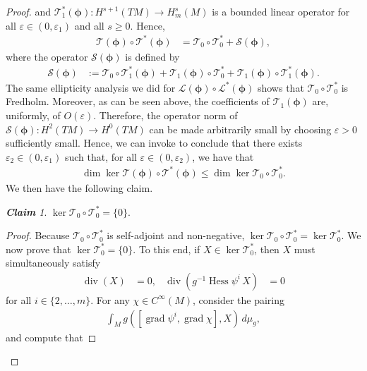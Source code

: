\documentclass{article}
\theoremstyle{remark}
\newtheorem*{claim*}{\bf Claim}
\newcommand{\M}{M}
\newcommand{\Cinf}{C^{\infty}(\M)}
\DeclareMathOperator{\grad}{\mathrm{grad}}
\DeclareMathOperator{\Div}{div}
\DeclareMathOperator{\Hess}{Hess}
\begin{document}
\begin{proof}
% 
and $\mathcal{T}_{1}^*(\bm{\phi}):H^{s+1}(T\M)\rightarrow H_m^{s}(\M)$ is a bounded linear operator for all $\varepsilon\in(0,\varepsilon_{1})$ and all $s\geq 0$. Hence,
%
\begin{align*}
    \mathcal{T}(\bm{\phi})\circ\mathcal{T}^*(\bm{\phi}) &= \mathcal{T}_0 \circ \mathcal{T}_0^* + \mathcal{S}(\bm{\phi}),
\end{align*}
%
where the operator $\mathcal{S}(\bm{\phi})$ is defined by
%
\begin{align*}
    \mathcal{S}(\bm{\phi})&:=\mathcal{T}_0\circ \mathcal{T}_{1}^*(\bm{\phi}) + \mathcal{T}_{1}(\bm{\phi}) \circ \mathcal{T}_{0}^* + \mathcal{T}_{1}(\bm{\phi})\circ \mathcal{T}_{1}^*(\bm{\phi}).
\end{align*}
%
The same ellipticity analysis we did for $\mathcal{L}(\bm{\phi})\circ\mathcal{L}^*(\bm{\phi})$ shows that $\mathcal{T}_0 \circ \mathcal{T}_0^*$ is Fredholm. Moreover, as can be seen above, the coefficients of $\mathcal{T}_{1}(\bm{\phi})$ are, uniformly, of $O(\varepsilon)$. Therefore, the operator norm of $\mathcal{S}(\bm{\phi}):H^2(T\M)\rightarrow H^0(T\M)$ can be made arbitrarily small by choosing $\varepsilon>0$ sufficiently small. Hence, we can invoke \cite[Theorem 5.22, Chapter IV]{kato1966perturbation} to conclude that there exists $\varepsilon_{2}\in(0,\varepsilon_1)$ such that, for all $\varepsilon\in(0,\varepsilon_2)$, we have that
%
\begin{align*}
    \dim \ker \mathcal{T}(\bm{\phi})\circ\mathcal{T}^*(\bm{\phi}) \leq  \dim \ker \mathcal{T}_0\circ \mathcal{T}_0^*.
\end{align*}
%
We then have the following claim.
%
\begin{claim*}
$\ker \mathcal{T}_0\circ \mathcal{T}_0^*= \{0\}$. 
\end{claim*}
%
\begin{proof}
    Because $\mathcal{T}_0 \circ \mathcal{T}_0^*$ is self-adjoint and non-negative, $\ker \mathcal{T}_0 \circ \mathcal{T}_0^*=\ker \mathcal{T}_0^*$.
%
%
We now prove that $\ker \mathcal{T}_0^*= \{0\}$.
%
To this end, if $X\in\ker \mathcal{T}_0^*$, then $X$ must simultaneously satisfy
%
\begin{align*}
    \Div(X) &= 0, & \Div(g^{-1}\Hess \psi^i\,X)&=0
\end{align*}
%
for all $i\in\{2,\dots,m\}$.
%
For any $\chi\in\Cinf$, consider the pairing
%
\begin{align*}
    \int_{\M} g([\grad\psi^i,\grad\chi],X)\,d\mu_g,
\end{align*}
%
and compute that

\end{proof}
\end{proof}
\end{document}
